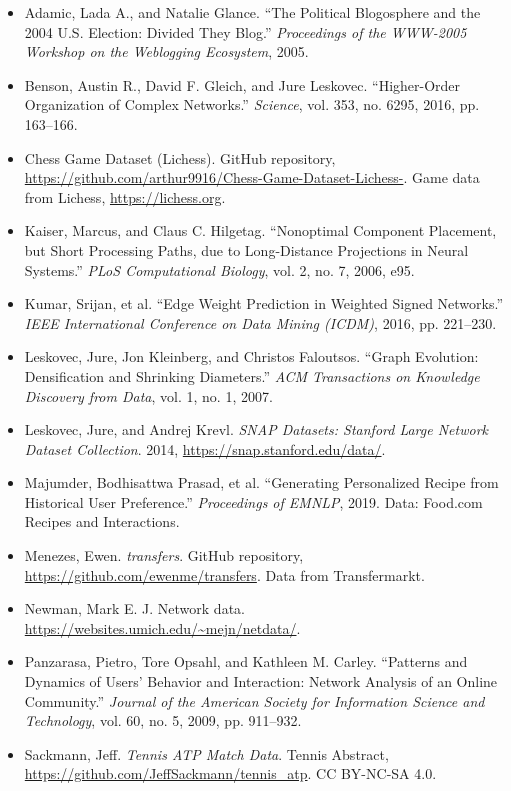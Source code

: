 \documentclass[11pt,a4paper]{article}
\begin{document}
\begin{itemize}[label={}, leftmargin=1.5em, itemindent=-1.5em]
\item Adamic, Lada A., and Natalie Glance. ``The Political Blogosphere and the 2004 U.S. Election: Divided They Blog.'' \emph{Proceedings of the WWW-2005 Workshop on the Weblogging Ecosystem}, 2005.
\item Benson, Austin R., David F. Gleich, and Jure Leskovec. ``Higher-Order Organization of Complex Networks.'' \emph{Science}, vol. 353, no. 6295, 2016, pp. 163--166.
\item Chess Game Dataset (Lichess). GitHub repository, \url{https://github.com/arthur9916/Chess-Game-Dataset-Lichess-}. Game data from Lichess, \url{https://lichess.org}.
\item Kaiser, Marcus, and Claus C. Hilgetag. ``Nonoptimal Component Placement, but Short Processing Paths, due to Long-Distance Projections in Neural Systems.'' \emph{PLoS Computational Biology}, vol. 2, no. 7, 2006, e95.
\item Kumar, Srijan, et al. ``Edge Weight Prediction in Weighted Signed Networks.'' \emph{IEEE International Conference on Data Mining (ICDM)}, 2016, pp. 221--230.
\item Leskovec, Jure, Jon Kleinberg, and Christos Faloutsos. ``Graph Evolution: Densification and Shrinking Diameters.'' \emph{ACM Transactions on Knowledge Discovery from Data}, vol. 1, no. 1, 2007.
\item Leskovec, Jure, and Andrej Krevl. \emph{SNAP Datasets: Stanford Large Network Dataset Collection}. 2014, \url{https://snap.stanford.edu/data/}.
\item Majumder, Bodhisattwa Prasad, et al. ``Generating Personalized Recipe from Historical User Preference.'' \emph{Proceedings of EMNLP}, 2019. Data: Food.com Recipes and Interactions.
\item Menezes, Ewen. \emph{transfers}. GitHub repository, \url{https://github.com/ewenme/transfers}. Data from Transfermarkt.
\item Newman, Mark E. J. Network data. \url{https://websites.umich.edu/~mejn/netdata/}.
\item Panzarasa, Pietro, Tore Opsahl, and Kathleen M. Carley. ``Patterns and Dynamics of Users' Behavior and Interaction: Network Analysis of an Online Community.'' \emph{Journal of the American Society for Information Science and Technology}, vol. 60, no. 5, 2009, pp. 911--932.
\item Sackmann, Jeff. \emph{Tennis ATP Match Data}. Tennis Abstract, \url{https://github.com/JeffSackmann/tennis_atp}. CC BY-NC-SA 4.0.

\end{itemize}
\end{document}
